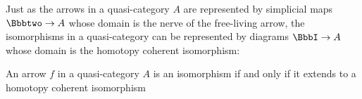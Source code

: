 



  Just as the arrows in a quasi-category $A$ are represented by simplicial maps $ \cattwo \to A$ whose domain is the nerve of the free-living arrow, the isomorphisms in a quasi-category can be represented by diagrams $\iso \to A$ whose domain is the homotopy coherent isomorphism:

   \begin{proposition}\label{prop:coherent-iso}
    An arrow $f$ in a quasi-category $A$ is an isomorphism if and only if it extends to a homotopy coherent isomorphism
   \begin{center}
   \end{center}
   \end{proposition}

